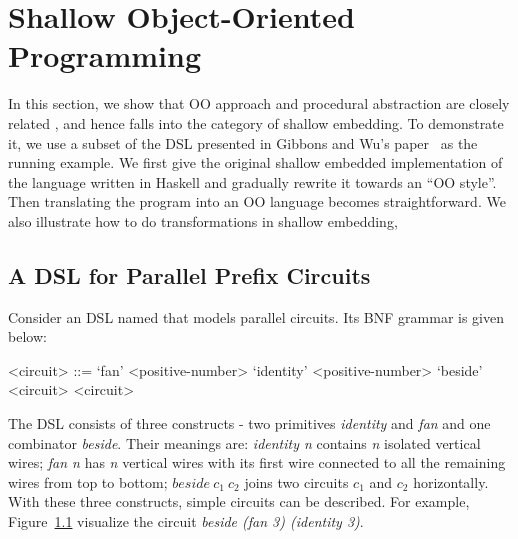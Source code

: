 \section{Shallow Object-Oriented Programming}\label{sec:oo}

\begin{comment}
Weixin writes this part.

Argue that shallow embeddings and straightforward OO 
programs are essentially the same thing. 

Start from a simple shallow DSL in Haskell, 
and iterate throught it until you reach a form 
that looks like an OO program.

Show how todo transformations in Shallow embeddings
using the insight of how to do transformations in OO
programs.

Show the correponding Java programs and the Java program 
with transformation that we can port back to Haskell.
\end{comment}

In this section, we show that OO approach and procedural abstraction are closely related
, and hence falls into the category of shallow embedding.
To demonstrate it, we use a subset
of the DSL presented in Gibbons and Wu's paper~\cite{gibbons2014folding} as the running example.
We first give the original shallow embedded implementation of the language
written in Haskell
and gradually rewrite it towards an ``OO style''.
Then translating the program into an OO language becomes straightforward.
We also illustrate how to do transformations in shallow embedding,

\subsection{A DSL for Parallel Prefix Circuits}
Consider an DSL named \dsl that models parallel circuits.
Its BNF grammar is given below:
\setlength{\grammarindent}{5em} %

\begin{grammar}
<circuit> ::= `fan' <positive-number>
\alt `identity' <positive-number>
\alt `beside' <circuit> <circuit>
\end{grammar}

The DSL consists of three constructs - two primitives
\emph{identity} and \emph{fan} and one combinator \emph{beside}.
Their meanings are: \emph{identity n} contains \emph{n} isolated vertical wires;
\emph{fan n} has \emph{n} vertical wires with its first wire connected to
all the remaining wires from top to bottom; $beside\ c_1\ c_2$ joins two circuits
$c_1$ and $c_2$ horizontally.
With these three constructs, simple circuits can be described.
For example, Figure~\ref{} visualize the circuit \emph{beside (fan 3) (identity 3)}.

